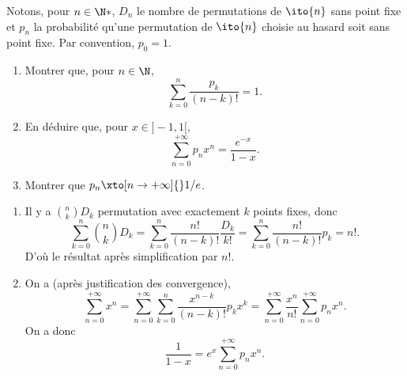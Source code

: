 \begin{enonce}
\begin{exercise}[ID={RMS133 E759},subtitle={Mines-Ponts PSI 2022},tags={},difficulty={}]
  Notons, pour $n\in\N*$, $D_n$ le nombre de permutations de $\ito{n}$ sans point fixe et $p_n$ la probabilité qu'une permutation de $\ito{n}$ choisie au hasard soit sans point fixe.
  Par convention, $p_0=1$.

  \begin{enumerate}
    \item Montrer que, pour $n\in\N$,
      \begin{equation*}
        \sum_{k=0}^n \frac{p_k}{(n-k)!} = 1.
      \end{equation*}

    \item En déduire que, pour $x\in]-1,1[$,
      \begin{equation*}
        \sum_{n=0}^{+\infty} p_n x^n = \frac{e^{-x}}{1-x}.
      \end{equation*}

    \item Montrer que $p_n \xto[n\to+\infty]{} 1/e$.
  \end{enumerate}
\end{exercise}
\begin{solution}
  \begin{enumerate}
    \item Il y a $\binom nk D_k$ permutation avec exactement $k$ points fixes, donc
      \begin{equation*}
        \sum_{k=0}^n \binom{n}{k} D_k 
        = \sum_{k=0}^n \frac{n!}{(n-k)!} \frac{D_k}{k!}
        = \sum_{k=0}^n \frac{n!}{(n-k)!} p_k
        = n!.
      \end{equation*}
      D'où le résultat après simplification par $n!$.


    \item On a (après justification des convergence),
      \begin{equation*}
        \sum_{n=0}^{+\infty} x^n
        =
        \sum_{n=0}^{+\infty} \sum_{k=0}^n \frac{x^{n-k}}{(n-k)!} p_k x^k
        =
        \sum_{n=0}^{+\infty} \frac{x^{n}}{n!}  \sum_{n=0}^{+\infty} p_n x^n.
      \end{equation*}
      On a donc
      \begin{equation*}
        \frac{1}{1-x}
        =
        e^x  \sum_{n=0}^{+\infty} p_n x^n.
      \end{equation*}


\end{enumerate}
\end{solution}
\end{enonce}
